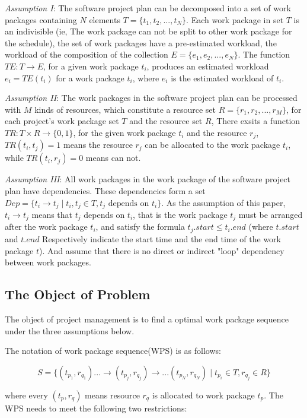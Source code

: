 \emph{Assumption I}:
The software project plan can be decomposed into a set of work packages
containing $N$ elements $T = \{t_1, t_2, ..., t_N \}$.
Each work package in set $T$ is an indivisible
(ie, The work package can not be split to other work package for the schedule),
the set of work packages have a pre-estimated workload,
the workload of the composition of the collection $E = \{e_1, e_2, ..., e_N \}$.
The function $TE: T \rightarrow E$, for a given work package $t_i$,
produces an estimated workload $e_i = TE(t_i)$ for a work package $t_i$,
where $e_i$ is the estimated workload of $t_i$.


\emph{Assumption II}:
The work packages in the software project plan can be processed with $M$ kinds of resources,
which constitute a resource set $R = \{r_1, r_2, ..., r_M \}$,
for each project's work package set $T$ and the resource set $R$,
There exsits a function $TR: T \times R \rightarrow \{0, 1\}$,
for the given work package $t_i$ and the resource $r_j$,
$TR(t_i, t_j) = 1$ means the resource $r_j$ can be allocated to the work package $t_i$,
while $TR (t_i, r_j) = 0$ means can not.


\emph{Assumption III}:
All work packages in the work package of the software project plan have dependencies.
These dependencies form a set $Dep = \{t_i \rightarrow t_j \mid t_i, t_j \in T, t_j \text{ depends on } t_i\}$.
As the assumption of this paper, $t_i \rightarrow t_j$ means that $t_j$ depends on $t_i$,
that is the work package $t_j$ must be arranged after the work package $t_i$, and satisfy the formula $t_j.start ≤ t_i.end$
(where $t.start$ and $t.end$ Respectively indicate the start time and the end time of the work package $t$).
And assume that there is no direct or indirect "loop" dependency between work packages.


\subsection{The Object of Problem}
%
The object of project management is to find a optimal work package sequence
under the three assumptions below.

The notation of work package sequence(WPS) is as follows:

\begin{equation}
  S = \{
  (t_{p_1}, r_{q_1}) ... \rightarrow (t_{p_j}, r_{q_j}) \rightarrow ... (t_{p_N}, r_{q_N})
  \mid t_{p_i} \in T, r_{q_j} \in R
  \}
\end{equation}

where every $(t_p, r_q)$ means resource $r_q$ is allocated to work package $t_p$.
The WPS needs to meet the following two restrictions:

